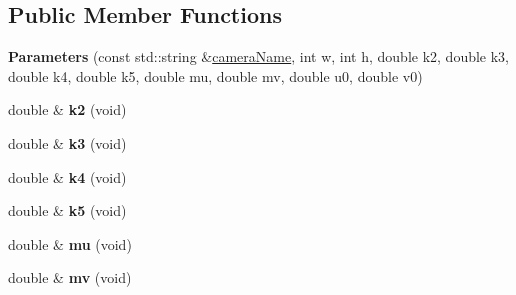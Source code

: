 \subsection*{Public Member Functions}
\begin{DoxyCompactItemize}
\item 
\mbox{\label{classcamodocal_1_1EquidistantCamera_1_1Parameters_a9a4415e63336ef5e01faa437473a150c}} 
{\bfseries Parameters} (const std\+::string \&\hyperlink{classcamodocal_1_1Camera_1_1Parameters_ad5d799e6367c5605907a941b2271e271}{camera\+Name}, int w, int h, double k2, double k3, double k4, double k5, double mu, double mv, double u0, double v0)
\item 
\mbox{\label{classcamodocal_1_1EquidistantCamera_1_1Parameters_a8321b31676332de9713e5f82455b4790}} 
double \& {\bfseries k2} (void)
\item 
\mbox{\label{classcamodocal_1_1EquidistantCamera_1_1Parameters_a1b0e320b2f3e0327af068a76c2a033c1}} 
double \& {\bfseries k3} (void)
\item 
\mbox{\label{classcamodocal_1_1EquidistantCamera_1_1Parameters_a899aca99da86b1ca618f87bebaff242d}} 
double \& {\bfseries k4} (void)
\item 
\mbox{\label{classcamodocal_1_1EquidistantCamera_1_1Parameters_a3f39e8ed2816e8219e6574cbcfe02efa}} 
double \& {\bfseries k5} (void)
\item 
\mbox{\label{classcamodocal_1_1EquidistantCamera_1_1Parameters_a6f78727822f94bcde74a140bc1b5d86a}} 
double \& {\bfseries mu} (void)
\item 
\mbox{\label{classcamodocal_1_1EquidistantCamera_1_1Parameters_a0391a4151b7e72fe2dbac2dc72930a73}} 
double \& {\bfseries mv} (void)
\item 
\mbox{\label{classcamodocal_1_1EquidistantCamera_1_1Parameters_a51427323e7a58e6e20ade8068f014d4e}} 

\end{DoxyCompactItemize}
